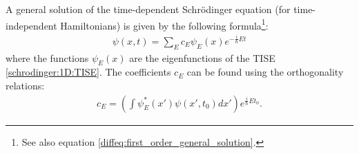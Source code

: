 	\begin{formula}
		A general solution of the time-dependent Schr\"odinger equation (for time-independent Hamiltonians) is given by the following formula\footnote{See also equation \ref{diffeq:first_order_general_solution}.}:
		\begin{gather}
			\label{schrodinger:1D:general_solution}
		        \psi(x, t) = \sum_Ec_E\psi_E(x)e^{-\frac{i}{\hbar}Et}
		\end{gather}
	        where the functions $\psi_E(x)$ are the eigenfunctions of the TISE \ref{schrodinger:1D:TISE}. The coefficients $c_E$ can be found using the orthogonality relations:
        	\begin{gather}
			\label{schrodinger:1D:general_solution_coefficients}
        		c_E=\left(\int\psi_E^*(x')\psi(x', t_0)dx'\right)e^{\frac{i}{\hbar}Et_0}.
		\end{gather}
	\end{formula}
